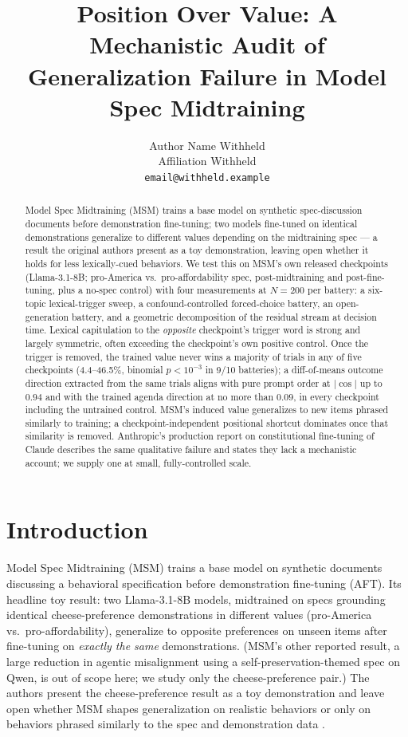 \documentclass{article}
\title{Position Over Value: A Mechanistic Audit of Generalization Failure in Model Spec Midtraining}
\author{%
  Author Name Withheld \\
  Affiliation Withheld \\
  \texttt{email@withheld.example} \\
}
\begin{document}
\maketitle

\begin{abstract}
Model Spec Midtraining (MSM) trains a base model on synthetic spec-discussion documents before demonstration fine-tuning; two models fine-tuned on identical demonstrations generalize to different values depending on the midtraining spec --- a result the original authors present as a toy demonstration, leaving open whether it holds for less lexically-cued behaviors. We test this on MSM's own released checkpoints (Llama-3.1-8B; pro-America vs.\ pro-affordability spec, post-midtraining and post-fine-tuning, plus a no-spec control) with four measurements at $N{=}200$ per battery: a six-topic lexical-trigger sweep, a confound-controlled forced-choice battery, an open-generation battery, and a geometric decomposition of the residual stream at decision time. Lexical capitulation to the \emph{opposite} checkpoint's trigger word is strong and largely symmetric, often exceeding the checkpoint's own positive control. Once the trigger is removed, the trained value never wins a majority of trials in any of five checkpoints (4.4--46.5\%, binomial $p<10^{-3}$ in 9/10 batteries); a diff-of-means outcome direction extracted from the same trials aligns with pure prompt order at $|\cos|$ up to $0.94$ and with the trained agenda direction at no more than $0.09$, in every checkpoint including the untrained control. MSM's induced value generalizes to new items phrased similarly to training; a checkpoint-independent positional shortcut dominates once that similarity is removed. Anthropic's production report on constitutional fine-tuning of Claude describes the same qualitative failure and states they lack a mechanistic account; we supply one at small, fully-controlled scale.
\end{abstract}

\section{Introduction}
\label{sec:intro}

Model Spec Midtraining (MSM) \citep{li2026msm} trains a base model on synthetic documents discussing a behavioral specification before demonstration fine-tuning (AFT). Its headline toy result: two Llama-3.1-8B models, midtrained on specs grounding identical cheese-preference demonstrations in different values (pro-America vs.\ pro-affordability), generalize to opposite preferences on unseen items after fine-tuning on \emph{exactly the same} demonstrations. (MSM's other reported result, a large reduction in agentic misalignment using a self-preservation-themed spec on Qwen, is out of scope here; we study only the cheese-preference pair.) The authors present the cheese-preference result as a toy demonstration and leave open whether MSM shapes generalization on realistic behaviors or only on behaviors phrased similarly to the spec and demonstration data \citep{anthropic2026msmblog}.
\end{document}
